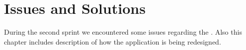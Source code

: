 
\chapter{Issues and Solutions}

During the second sprint we encountered some issues regarding the \gc. Also this chapter includes description of how the \ct application is being redesigned. 








